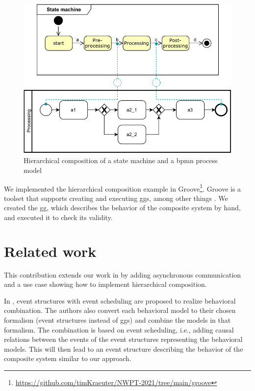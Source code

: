 \documentclass[a4paper]{easychair}
\begin{document}
\begin{figure}[h]
    \centering
    \includegraphics[width=.5\textwidth]{images/usecase.pdf}
    \caption{Hierarchical composition of a state machine and a \gls{bpmn} process model}
    \label{fig:useCase}
\end{figure}
We implemented the hierarchical composition example in Groove\footnote{\url{https://github.com/timKraeuter/NWPT-2021/tree/main/groove}}. %
Groove is a toolset that supports creating and executing \glspl{gg}, among other things \cite{ghamarianModellingAnalysisUsing2012, rensinkGROOVESimulatorTool2004}.
We created the \gls{gg}, which describes the behavior of the composite system by hand, and executed it to check its validity.

\section{Related work}
This contribution extends our work in \cite{krauterBehavioralConsistencyHeterogeneous2021} by adding asynchronous communication and a use case showing how to implement hierarchical composition.

In \cite{kienzleUnifyingFrameworkHomogeneous2019}, event structures with event scheduling are proposed to realize behavioral combination.
The authors also convert each behavioral model to their chosen formalism (event structures instead of \glspl{gg}) and combine the models in that formalism.
The combination is based on event scheduling, i.e., adding causal relations between the events of the event structures representing the behavioral models.
This will then lead to an event structure describing the behavior of the composite system similar to our approach.


\end{document}
